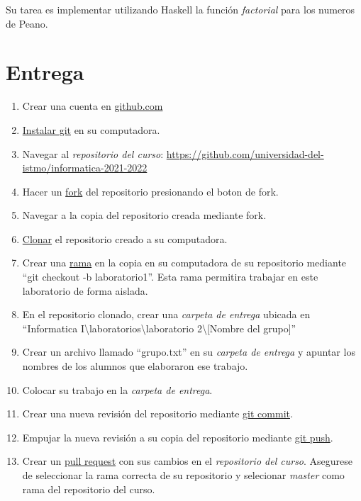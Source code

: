 \documentclass{article}
\begin{document}
Su tarea es implementar utilizando Haskell la funci\'on
\emph{factorial} para los numeros de Peano.

\section*{Entrega}

\begin{enumerate}
\item{Crear una cuenta en \url{github.com}}
\item{\href{https://github.com/git-guides/install-git}{Instalar git} en su computadora.}
\item{Navegar al \emph{repositorio del curso}: \url{https://github.com/universidad-del-istmo/informatica-2021-2022}}
\item{Hacer un \href{https://docs.github.com/en/get-started/quickstart/fork-a-repo}{fork} del
repositorio presionando el boton de fork.}
\item{Navegar a la copia del repositorio creada mediante fork.}
\item{\href{https://docs.github.com/en/github/creating-cloning-and-archiving-repositories/cloning-a-repository-from-github/cloning-a-repository}{Clonar} el
repositorio creado a su computadora.}
\item{Crear una \href{https://docs.github.com/en/github/collaborating-with-pull-requests/proposing-changes-to-your-work-with-pull-requests/about-branches}{rama} en
la copia en su computadora de su repositorio mediante ``git checkout -b laboratorio1''. Esta
rama permitira trabajar en este laboratorio de forma aislada.}
\item{En el repositorio clonado, crear una \emph{carpeta de entrega} ubicada en ``Informatica I\textbackslash laboratorios\textbackslash laboratorio 2\textbackslash [Nombre del grupo]''}
\item{Crear un archivo llamado ``grupo.txt'' en su \emph{carpeta de entrega} y apuntar los nombres
de los alumnos que elaboraron ese trabajo.}
\item{Colocar su trabajo en la \emph{carpeta de entrega}.}
\item{Crear una nueva revisi\'on del repositorio mediante \href{https://github.com/git-guides/git-commit}{git commit}.}
\item{Empujar la nueva revisi\'on a su copia del repositorio mediante \href{https://github.com/git-guides/git-push}{git push}.}
\item{Crear un \href{https://docs.github.com/en/github/collaborating-with-pull-requests/proposing-changes-to-your-work-with-pull-requests/about-pull-requests}{pull request} con sus cambios en el \emph{repositorio del curso}.
Asegurese de seleccionar la rama correcta de su repositorio y selecionar \emph{master} como
rama del repositorio del curso.}
\end{enumerate}
\end{document}
